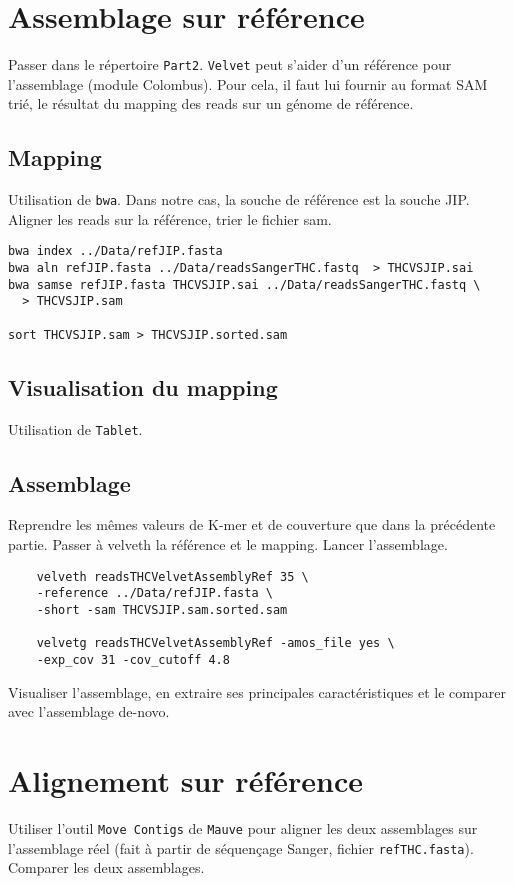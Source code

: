\documentclass[a4paper,12pt]{article}
\begin{document}
\section{Assemblage sur référence}
\label{sec:assr}

Passer dans le répertoire \verb=Part2=. \verb=Velvet= peut s'aider d'un référence pour l'assemblage (module Colombus). Pour cela, il faut lui fournir au format SAM trié, le résultat du mapping des reads sur un génome de référence.

\subsection{Mapping}
Utilisation de \verb=bwa=. Dans notre cas, la souche de référence est la souche JIP. Aligner les reads sur la référence, trier le fichier sam.


\begin{lstlisting}
bwa index ../Data/refJIP.fasta
bwa aln refJIP.fasta ../Data/readsSangerTHC.fastq  > THCVSJIP.sai
bwa samse refJIP.fasta THCVSJIP.sai ../Data/readsSangerTHC.fastq \
  > THCVSJIP.sam

sort THCVSJIP.sam > THCVSJIP.sorted.sam

\end{lstlisting}
\subsection{Visualisation du mapping}
Utilisation de \verb=Tablet=.

\subsection{Assemblage}
Reprendre les mêmes valeurs de K-mer et de couverture que dans la précédente partie. Passer à velveth la référence et le mapping. Lancer l'assemblage.

\begin{lstlisting}
	velveth readsTHCVelvetAssemblyRef 35 \
	-reference ../Data/refJIP.fasta \
	-short -sam THCVSJIP.sam.sorted.sam 
	
	velvetg readsTHCVelvetAssemblyRef -amos_file yes \
	-exp_cov 31 -cov_cutoff 4.8
\end{lstlisting}

Visualiser l'assemblage, en extraire ses principales caractéristiques et le comparer avec l'assemblage de-novo.

\section{Alignement sur référence}
Utiliser l'outil \verb=Move Contigs= de \verb=Mauve= pour aligner les deux assemblages sur l'assemblage réel (fait à partir de séquençage Sanger, fichier \verb=refTHC.fasta=). Comparer les deux assemblages. 

{}

\end{document}
